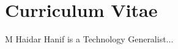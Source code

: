 \cleardoublepage
{}

\thispagestyle{empty}

\chapter*{Curriculum Vitae}
\label{chap:cv}

\begin{figure}[htb]
    \centering
    \label{fig:cv:mhaidarhanif}
\end{figure}

M Haidar Hanif is a Technology Generalist...


